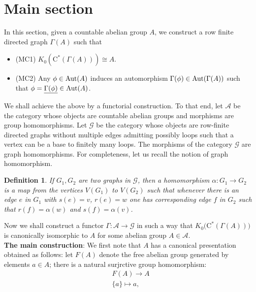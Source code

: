 \documentclass[a4paper,11pt,reqno]{amsart}
\theoremstyle{plain}
\newtheorem{defn}[thm]{Definition}
\theoremstyle{named}
\numberwithin{equation}{section}
\begin{document}
           \section{Main section}
           In this section, given a countable abelian group $A$, we construct a row finite directed graph $\Gamma(A)$ such that 
           \begin{itemize}
               \item (MC1) $K_{0}(\textrm{C}^{\ast}(\Gamma(A)))\cong A$.
               \item (MC2) Any $\phi\in{\rm Aut}(A)$ induces an automorphism $\Gamma(\phi)\in{\rm Aut}(\Gamma(A))$ such that $\phi=\underline{\Gamma(\phi)}\in{\rm Aut}(A)$.  
                        \end{itemize}
                         We shall achieve the above by a functorial construction. To that end, let $\mathcal{A}$ be the category whose objects are countable abelian groups and morphisms are group homomorphisms. Let $\mathcal{G}$ be the category whose objects are row-finite directed graphs without multiple edges admitting possibly loops such that a vertex can be a base to finitely many loops. The morphisms of the category $\mathcal{G}$ are graph homomorphisms. For completeness, let us recall the notion of graph homomorphism.
                        \begin{defn}
                            If $G_{1},G_{2}$ are two graphs in $\mathcal{G}$, then a homomorphism $\alpha:G_{1}\rightarrow G_{2}$ is a map from the vertices $V(G_{1})$ to $V(G_{2})$ such that whenever there is an edge $e$ in $G_{1}$ with $s(e)=v$, $r(e)=w$ one has corresponding edge $f$ in $G_{2}$ such that $r(f)=\alpha(w)$ and $s(f)=\alpha(v)$.
                        \end{defn}
                        Now we shall construct a functor $\Gamma:\mathcal{A}\rightarrow\mathcal{G}$ in such a way that $K_{0}\Big(\textrm{C}^{\ast}(\Gamma(A))\Big)$ is canonically isomorphic to $A$ for some abelian group $A\in\mathcal{A}$.\vspace{0.2in}\\
                        {\bf The main construction}: We first note that $A$ has a canonical presentation obtained as follows: let $F(A)$ denote the free abelian group generated by elements $a\in A$; there is a natural surjrctive group homomorphism:
                        \begin{align*}
                          &F(A)\rightarrow A\\
                          & \{a\}\mapsto a,
                        \end{align*}
\end{document}
